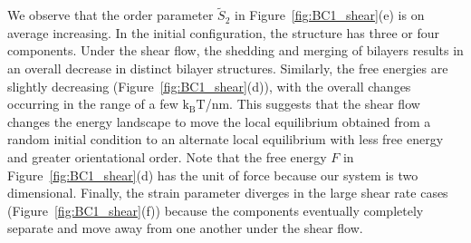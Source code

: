 \documentclass[prb,preprint,showpacs,preprintnumbers,amsmath,amssymb,longbibliography]{revtex4-1}
\begin{document}
We observe that the order parameter $\tilde S_2$ in
Figure~\ref{fig:BC1_shear}(e) is on average increasing. In the initial
configuration, the structure has three or four components.
%
Under the shear flow, the shedding and merging of bilayers results in an
overall decrease in distinct bilayer structures. Similarly, the free
energies are slightly decreasing (Figure~\ref{fig:BC1_shear}(d)), with
the overall changes occurring in the range of a few $\mathrm{k_BT}$/nm.
This suggests that the shear flow changes the energy landscape to move
the local equilibrium obtained from a random initial condition to an
alternate local equilibrium with less free energy and greater
orientational order.  Note that the free energy $F$ in
Figure~\ref{fig:BC1_shear}(d) has the unit of force because our system
is two dimensional.
%
%
Finally, the strain parameter diverges in the large shear rate cases
(Figure~\ref{fig:BC1_shear}(f))
because the components eventually completely separate and move away from one another
under the shear flow.
\end{document}
